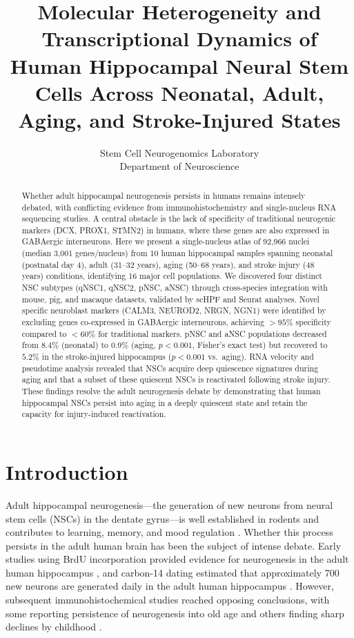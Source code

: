 \documentclass[11pt]{article}
\title{Molecular Heterogeneity and Transcriptional Dynamics of Human Hippocampal Neural Stem Cells Across Neonatal, Adult, Aging, and Stroke-Injured States}
\author{
Stem Cell Neurogenomics Laboratory\\
Department of Neuroscience\\
}
\date{}
\begin{document}
\maketitle

\begin{abstract}
Whether adult hippocampal neurogenesis persists in humans remains intensely debated, with conflicting evidence from immunohistochemistry and single-nucleus RNA sequencing studies. A central obstacle is the lack of specificity of traditional neurogenic markers (DCX, PROX1, STMN2) in humans, where these genes are also expressed in GABAergic interneurons. Here we present a single-nucleus atlas of 92,966 nuclei (median 3,001 genes/nucleus) from 10 human hippocampal samples spanning neonatal (postnatal day 4), adult (31--32 years), aging (50--68 years), and stroke injury (48 years) conditions, identifying 16 major cell populations. We discovered four distinct NSC subtypes (qNSC1, qNSC2, pNSC, aNSC) through cross-species integration with mouse, pig, and macaque datasets, validated by scHPF and Seurat analyses. Novel specific neuroblast markers (CALM3, NEUROD2, NRGN, NGN1) were identified by excluding genes co-expressed in GABAergic interneurons, achieving $> 95\%$ specificity compared to $< 60\%$ for traditional markers. pNSC and aNSC populations decreased from $8.4\%$ (neonatal) to $0.9\%$ (aging, $p < 0.001$, Fisher's exact test) but recovered to $5.2\%$ in the stroke-injured hippocampus ($p < 0.001$ vs.\ aging). RNA velocity and pseudotime analysis revealed that NSCs acquire deep quiescence signatures during aging and that a subset of these quiescent NSCs is reactivated following stroke injury. These findings resolve the adult neurogenesis debate by demonstrating that human hippocampal NSCs persist into aging in a deeply quiescent state and retain the capacity for injury-induced reactivation.
\end{abstract}

\section{Introduction}

Adult hippocampal neurogenesis---the generation of new neurons from neural stem cells (NSCs) in the dentate gyrus---is well established in rodents and contributes to learning, memory, and mood regulation \citep{ming2011adult, bond2015adult}. Whether this process persists in the adult human brain has been the subject of intense debate. Early studies using BrdU incorporation provided evidence for neurogenesis in the adult human hippocampus \citep{eriksson1998neurogenesis}, and carbon-14 dating estimated that approximately 700 new neurons are generated daily in the adult human hippocampus \citep{spalding2013dynamics}. However, subsequent immunohistochemical studies reached opposing conclusions, with some reporting persistence of neurogenesis into old age \citep{boldrini2018human, moreno2021neurogenesis, tobin2019human} and others finding sharp declines by childhood \citep{sorrells2018human}.
\end{document}
